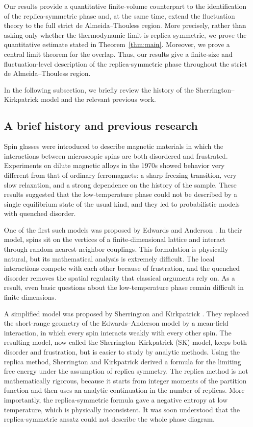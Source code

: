 \documentclass[11pt]{article}
\numberwithin{equation}{section}
\newcommand{\1}{\mathbf 1}
\begin{document}
Our results provide a quantitative finite-volume counterpart to the identification of the replica-symmetric phase and, at the same time, extend the fluctuation theory to the full strict de Almeida--Thouless region. More precisely, rather than asking only whether the thermodynamic limit is replica symmetric, we  prove the quantitative estimate stated in Theorem~\ref{thm:main}. Moreover, we prove a central limit theorem for the overlap. Thus, our results give a finite-size and fluctuation-level description of the replica-symmetric phase throughout the strict de Almeida--Thouless region.




In the following subsection, we briefly review the history of the Sherrington--Kirkpatrick model and the relevant previous work.

\subsection{A brief history and previous research} 
Spin glasses were introduced to describe magnetic materials in which the interactions between microscopic spins are both disordered and frustrated. Experiments on dilute magnetic alloys in the 1970s showed  behavior very different from that of ordinary ferromagnets: a sharp freezing transition, very slow relaxation, and a strong dependence on the history of the sample. These results suggested that the low-temperature phase could not be described by a single equilibrium state of the usual kind, and they led to probabilistic models with quenched disorder.

One of the first such models was proposed by Edwards and Anderson \cite{EdwardsAnderson1975}. In their model, spins sit on the vertices of a finite-dimensional lattice and interact through random nearest-neighbor couplings. This formulation is physically natural, but its mathematical analysis is extremely difficult. The local interactions compete with each other because of frustration, and the quenched disorder removes the spatial regularity that classical arguments rely on. As a result, even basic questions about the low-temperature phase remain difficult in finite dimensions.

A simplified model was proposed by Sherrington and Kirkpatrick \cite{SherringtonKirkpatrick1975}. They replaced the short-range geometry of the Edwards--Anderson model by a mean-field interaction, in which every spin interacts weakly with every other spin. The resulting model, now called the Sherrington--Kirkpatrick (SK) model, keeps both disorder and frustration, but is easier to study by analytic methods. Using the replica method, Sherrington and Kirkpatrick derived a formula for the limiting free energy under the assumption of replica symmetry. The replica method is not mathematically rigorous, because it starts from integer moments of the partition function and then uses an analytic continuation in the number of replicas. More importantly, the replica-symmetric formula gave a negative entropy at low temperature, which is physically inconsistent. It was soon understood that the replica-symmetric ansatz could not describe the whole phase diagram.
\end{document}
